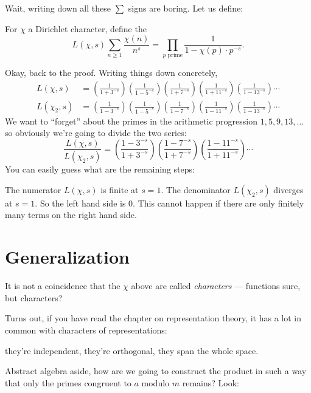Wait, writing down all these $\sum$ signs are boring. Let us define:
\begin{definition}[$L$-series]
	For $\chi$ a Dirichlet character, define the 
	\[ L(\chi, s) \sum_{n \geq 1} \frac{\chi(n)}{n^s}
	= \prod_{p\text{ prime}} \frac{1}{1-\chi(p) \cdot p^{-s}}. \]
\end{definition}

Okay, back to the proof. Writing things down concretely,
\begin{align*}
	L(\chi, s) &=
	\left( \frac{1}{1+3^{-s}} \right)
	\left( \frac{1}{1-5^{-s}} \right)
	\left( \frac{1}{1+7^{-s}} \right)
	\left( \frac{1}{1+11^{-s}} \right)
	\left( \frac{1}{1-13^{-s}} \right) \cdots
	\\
	L(\chi_2, s) &=
	\left( \frac{1}{1-3^{-s}} \right)
	\left( \frac{1}{1-5^{-s}} \right)
	\left( \frac{1}{1-7^{-s}} \right)
	\left( \frac{1}{1-11^{-s}} \right)
	\left( \frac{1}{1-13^{-s}} \right) \cdots
\end{align*}
We want to ``forget'' about the primes in the arithmetic progression $1, 5, 9, 13, \dots$
so obviously we're going to divide the two series:
\[
	\frac{L(\chi, s)}{L(\chi_2, s)} =
	\left( \frac{1-3^{-s}}{1+3^{-s}} \right)
	\left( \frac{1-7^{-s}}{1+7^{-s}} \right)
	\left( \frac{1-11^{-s}}{1+11^{-s}} \right) \cdots
\]
You can easily guess what are the remaining steps:
\begin{itemize}
	\ii The numerator $L(\chi, s)$ is finite at $s = 1$.
	\ii The denominator $L(\chi_2, s)$ diverges at $s = 1$.
	\ii So the left hand side is $0$.
	\ii This cannot happen if there are only finitely many terms on the right hand side.
\end{itemize}

\section{Generalization}

It is not a coincidence that the $\chi$ above are called \emph{characters} --- functions sure, but
characters?

Turns out, if you have read the chapter on representation theory,
it has a lot in common with characters of representations:
\begin{itemize}
	\ii they're independent,
	\ii they're orthogonal,
	\ii they span the whole space.
\end{itemize}

Abstract algebra aside, how are we going to construct the product in such a way that only the primes
congruent to $a$ modulo $m$ remains?
Look:

